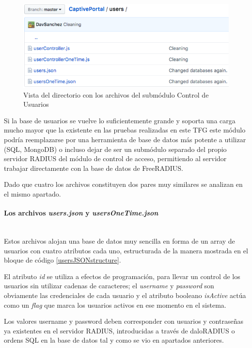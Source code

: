 \begin{figure}[!t]
\begin{center}
\includegraphics[width=0.75\linewidth]{./5_AnalisisOrganico/Img/usersDir.png}
\end{center}
\caption{Vista del directorio con los archivos del submódulo Control de Usuarios}
\label{usersDir}
\end{figure}

Si la base de usuarios se vuelve lo suficientemente grande y soporta una carga mucho mayor que la existente en las pruebas realizadas en este TFG este módulo podría reemplazarse por una herramienta de base de datos más potente a utilizar (SQL, MongoDB) o incluso dejar de ser un submódulo separado del propio servidor RADIUS del módulo de control de acceso, permitiendo al servidor trabajar directamente con la base de datos de FreeRADIUS.

Dado que cuatro los archivos constituyen dos pares muy similares se analizan en el mismo apartado.

\paragraph{Los archivos \emph{users.json} y \emph{usersOneTime.json}} \label{usersJSONFiles} ~\\

Estos archivos alojan una base de datos muy sencilla en forma de un array de usuarios con cuatro atributos cada uno, estructurada de la manera mostrada en el bloque de código \ref{usersJSONstructure}.

El atributo \emph{id} se utiliza a efectos de programación, para llevar un control de los usuarios sin utilizar cadenas de caracteres; el \emph{username} y \emph{password} son obviamente las credenciales de cada usuario y el atributo booleano \emph{isActive} actúa como un \emph{flag} que marca los usuarios activos en ese momento en el sistema.

Los valores username y password deben corresponder con usuarios y contraseñas ya existentes en el servidor RADIUS, introducidas a través de daloRADIUS o ordens SQL en la base de datos tal y como se vio en apartados anteriores.

